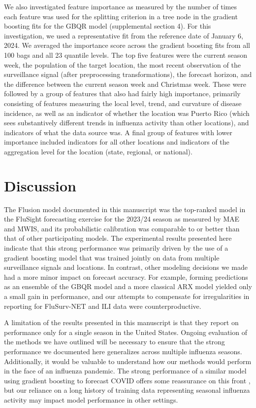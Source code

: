 \documentclass{article}\usepackage[]{graphicx}\usepackage[]{xcolor}
\begin{document}
We also investigated feature importance as measured by the number of times each feature was used for the splitting criterion in a tree node in the gradient boosting fits for the GBQR model (supplemental section 4). For this investigation, we used a representative fit from the reference date of January 6, 2024. We averaged the importance score across the gradient boosting fits from all 100 bags and all 23 quantile levels.  The top five features were the current season week, the population of the target location, the most recent observation of the surveillance signal (after preprocessing transformations), the forecast horizon, and the difference between the current season week and Christmas week.  These were followed by a group of features that also had fairly high importance, primarily consisting of features measuring the local level, trend, and curvature of disease incidence, as well as an indicator of whether the location was Puerto Rico (which sees substantively different trends in influenza activity than other locations), and indicators of what the data source was. A final group of features with lower importance included indicators for all other locations and indicators of the aggregation level for the location (state, regional, or national).

\section{Discussion}
\label{sec:discussion}

The Flusion model documented in this manuscript was the top-ranked model in the FluSight forecasting exercise for the 2023/24 season as measured by MAE and MWIS, and its probabilistic calibration was comparable to or better than that of other participating models. The experimental results presented here indicate that this strong performance was primarily driven by the use of a gradient boosting model that was trained jointly on data from multiple surveillance signals and locations. In contrast, other modeling decisions we made had a more minor impact on forecast accuracy. For example, forming predictions as an ensemble of the GBQR model and a more classical ARX model yielded only a small gain in performance, and our attempts to compensate for irregularities in reporting for FluSurv-NET and ILI data were counterproductive.

A limitation of the results presented in this manuscript is that they report on performance only for a single season in the United States. Ongoing evaluation of the methods we have outlined will be necessary to ensure that the strong performance we documented here generalizes across multiple influenza seasons. Additionally, it would be valuable to understand how our methods would perform in the face of an influenza pandemic. The strong performance of a similar model using gradient boosting to forecast COVID offers some reassurance on this front \cite{lopez2024covidCase}, but our reliance on a long history of training data representing seasonal influenza activity may impact model performance in other settings.
\end{document}
